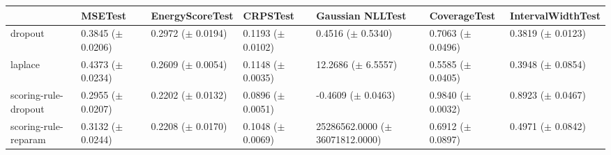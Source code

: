 \begin{tabular}{lllllll}
\toprule
 & MSETest & EnergyScoreTest & CRPSTest & Gaussian NLLTest & CoverageTest & IntervalWidthTest \\
\midrule
dropout & \makecell{0.3845 \\ ($\pm$ 0.0206)} & \makecell{0.2972 \\ ($\pm$ 0.0194)} & \makecell{0.1193 \\ ($\pm$ 0.0102)} & \makecell{0.4516 \\ ($\pm$ 0.5340)} & \makecell{0.7063 \\ ($\pm$ 0.0496)} & \makecell{0.3819 \\ ($\pm$ 0.0123)} \\
laplace & \makecell{0.4373 \\ ($\pm$ 0.0234)} & \makecell{0.2609 \\ ($\pm$ 0.0054)} & \makecell{0.1148 \\ ($\pm$ 0.0035)} & \makecell{12.2686 \\ ($\pm$ 6.5557)} & \makecell{0.5585 \\ ($\pm$ 0.0405)} & \makecell{0.3948 \\ ($\pm$ 0.0854)} \\
scoring-rule-dropout & \makecell{0.2955 \\ ($\pm$ 0.0207)} & \makecell{0.2202 \\ ($\pm$ 0.0132)} & \makecell{0.0896 \\ ($\pm$ 0.0051)} & \makecell{-0.4609 \\ ($\pm$ 0.0463)} & \makecell{0.9840 \\ ($\pm$ 0.0032)} & \makecell{0.8923 \\ ($\pm$ 0.0467)} \\
scoring-rule-reparam & \makecell{0.3132 \\ ($\pm$ 0.0244)} & \makecell{0.2208 \\ ($\pm$ 0.0170)} & \makecell{0.1048 \\ ($\pm$ 0.0069)} & \makecell{25286562.0000 \\ ($\pm$ 36071812.0000)} & \makecell{0.6912 \\ ($\pm$ 0.0897)} & \makecell{0.4971 \\ ($\pm$ 0.0842)} \\
\bottomrule
\end{tabular}
